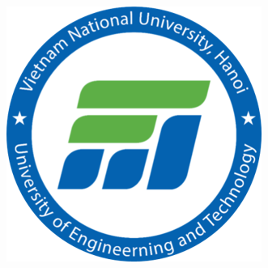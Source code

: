 \documentclass[%
  final,%
  english,%
]{beamer}
\begin{document}
\begin{frame}[t, fragile = singleslide]
\begin{columns}[t, onlytextwidth]
\begin{column}{0.1\textwidth}
\begin{flushright}
\includegraphics[width = \columnwidth]{./Logos/FIT-logo}%
\end{flushright}
\end{column}
%
\end{columns}%


\end{frame}
\end{document}

